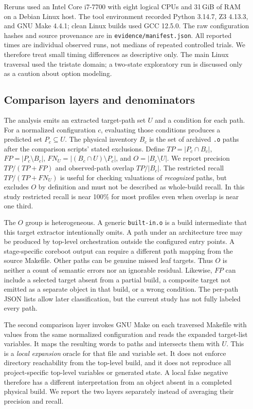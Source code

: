 \documentclass[acmsmall,screen,review]{acmart}
\begin{document}
Reruns used an Intel Core i7-7700 with eight logical CPUs and 31\,GiB of RAM on a Debian Linux host. The tool environment recorded Python 3.14.7, Z3 4.13.3, and GNU Make 4.4.1; clean Linux builds used GCC 12.5.0. The raw configuration hashes and source provenance are in \texttt{evidence/manifest.json}. All reported times are individual observed runs, not medians of repeated controlled trials. We therefore treat small timing differences as descriptive only. The main Linux traversal used the tristate domain; a two-state exploratory run is discussed only as a caution about option modeling.

\subsection{Comparison layers and denominators}
\label{sec:eval:method}
The analysis emits an extracted target-path set $U$ and a condition for each path. For a normalized configuration $c$, evaluating those conditions produces a predicted set $P_c\subseteq U$. The physical inventory $B_c$ is the set of archived \texttt{.o} paths after the comparison scripts' stated exclusions. Define $TP=|P_c\cap B_c|$, $FP=|P_c\setminus B_c|$, $FN_U=|(B_c\cap U)\setminus P_c|$, and $O=|B_c\setminus U|$. We report precision $TP/(TP+FP)$ and observed-path overlap $TP/|B_c|$. The restricted recall $TP/(TP+FN_U)$ is useful for checking valuations of \emph{recognized} paths, but excludes $O$ by definition and must not be described as whole-build recall. In this study restricted recall is near 100\% for most profiles even when overlap is near one third.

The $O$ group is heterogeneous. A generic \texttt{built-in.o} is a build intermediate that this target extractor intentionally omits. A path under an architecture tree may be produced by top-level orchestration outside the configured entry points. A stage-specific coreboot output can require a different path mapping from the source Makefile. Other paths can be genuine missed leaf targets. Thus $O$ is neither a count of semantic errors nor an ignorable residual. Likewise, $FP$ can include a selected target absent from a partial build, a composite target not emitted as a separate object in that build, or a wrong condition. The per-path JSON lists allow later classification, but the current study has not fully labeled every path.

The second comparison layer invokes GNU Make on each traversed Makefile with values from the same normalized configuration and reads the expanded target-list variables. It maps the resulting words to paths and intersects them with $U$. This is a \emph{local expansion} oracle for that file and variable set. It does not enforce directory reachability from the top-level build, and it does not reproduce all project-specific top-level variables or generated state. A local false negative therefore has a different interpretation from an object absent in a completed physical build. We report the two layers separately instead of averaging their precision and recall.
\end{document}
